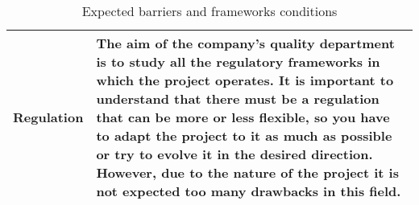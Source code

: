 \begin{table}[H]
\begin{tabular}{l p{12cm}}
		Regulation & The aim of the company's quality department is to study all the regulatory frameworks in which the project operates. It is important to understand that there must be a regulation that can be more or less flexible, so you have to adapt the project to it as much as possible or try to evolve it in the desired direction. However, due to the nature of the project it is not expected too many drawbacks in this field.\vspace{0.2cm}\\
		
		
		\bottomrule[2pt]
		
	\end{tabular}
	\caption{Expected barriers and frameworks conditions}
\end{table}